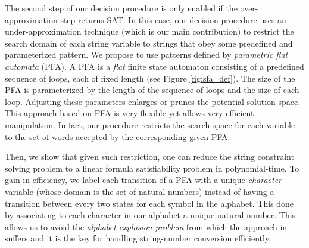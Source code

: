 \documentclass[sigplan,review,anonymous]{acmart}\settopmatter{printfolios=true,printccs=false,printacmref=false}
\begin{document}
The second step of our decision procedure is only enabled if the over-approximation step returns SAT. In this case, our decision procedure uses an under-approximation technique (which is  our main contribution) to restrict the search domain of each string variable to strings that obey some predefined and parameterized pattern.  We propose to use patterns defined by \emph{parametric flat automata} (PFA). A PFA is a {\em flat} finite state automaton consisting of a predefined sequence of loops, each of fixed length (see Figure \ref{fig:sfa_def}). The size of the PFA is parameterized by the length of the sequence of loops and the size of each loop. Adjusting these parameters enlarges or prunes the potential solution space. This approach based on PFA is very flexible yet allows very efficient manipulation. In fact, our procedure restricts the search space for each variable to the set of words accepted by the corresponding given PFA. 


Then, we show that given such restriction, one can  reduce the string constraint solving problem to a linear formula satisfiability problem in polynomial-time. To gain in efficiency, we label each transition  of a PFA with a unique \emph{character} variable (whose domain is the set of natural numbers) instead of having a transition between every two states for each symbol in the alphabet.  This done by associating to each character in our alphabet a unique natural number. This allows us to avoid the \textit{alphabet explosion problem} from which the approach in~\cite{abdulla2017flatten} suffers and it is  the key for handling string-number conversion efficiently. 
\end{document}
